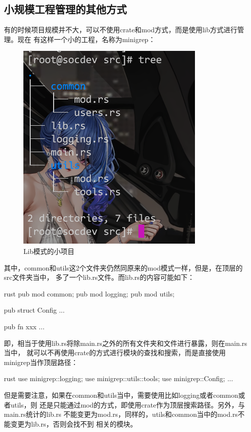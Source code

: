 \subsection{小规模工程管理的其他方式}
有的时候项目规模并不大，可以不使用crate和mod方式，而是使用lib方式进行管理。现在
有这样一个小的工程，名称为minigrep：
\begin{figure}[H]
  \centering
  \includegraphics[scale=0.8]{rust_lib_mod.png}
  \caption{Lib模式的小项目}
  \label{fig:rust_lib_mod}
\end{figure}
其中，common和utils这2个文件夹仍然同原来的mod模式一样，但是，在顶层的src文件夹当中，
多了一个lib.rs文件。而lib.rs的内容可能如下：
\begin{code-block}{rust}
pub mod common;
pub mod logging;
pub mod utils;

pub struct Config {
    ...
}

pub fn xxx {
   ...
}
\end{code-block}
即，相当于使用lib.rs将除main.rs之外的所有文件夹和文件进行暴露，则在main.rs当中，
就可以不再使用crate的方式进行模块的查找和搜索，而是直接使用minigrep当作顶层路径：
\begin{code-block}{rust}
use minigrep::logging;
use minigrep::utils::tools;
use minigrep::Config;
...
\end{code-block}

但是需要注意，如果在common和utils当中，需要使用比如logging或者common或者utils，则
还是只能通过mod的方式，即使用crate作为顶层搜索路径。另外，与main.rs统计的lib.rs
不能变更为mod.rs，同样的，utils和common当中的mod.rs不能变更为lib.rs，否则会找不到
相关的模块。

